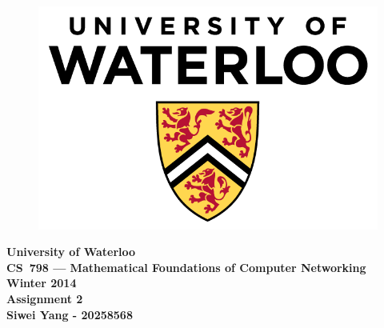 \documentclass[letterpaper]{article}
\begin{document}
\begin{figure}
\centering
\includegraphics[scale=0.55]{UniversityOfWaterloo_logo_vert_rgb}
\end{figure}

\vspace*{50 mm}

\begin{center}
\large\bf University of Waterloo\\
CS~798 --- Mathematical Foundations of Computer Networking\\
Winter 2014\\
Assignment 2\\
Siwei Yang - 20258568\\
\end{center}
\newpage
\end{document}
